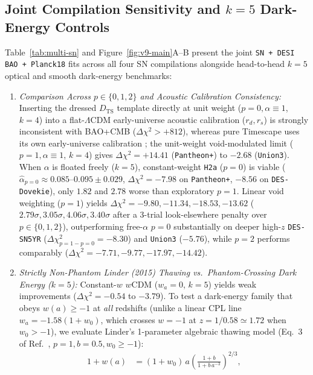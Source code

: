 \documentclass[11pt,a4paper]{article}
\begin{document}
\subsection{Joint Compilation Sensitivity and $k = 5$ Dark-Energy Controls}
Table~\ref{tab:multi-sn} and Figure~\ref{fig:v9-main}A--B present the joint \texttt{SN + DESI BAO + Planck18} fits across all four SN compilations alongside head-to-head $k = 5$ optical and smooth dark-energy benchmarks:
\begin{enumerate}
    \item \textit{Comparison Across $p \in \{0, 1, 2\}$ and Acoustic Calibration Consistency:} Inserting the dressed $D_{\mathrm{TS}}$ template directly at unit weight ($p = 0, \alpha \equiv 1$, $k = 4$) into a flat-$\Lambda$CDM early-universe acoustic calibration ($r_d, r_s$) is strongly inconsistent with BAO+CMB ($\Delta\chi^2 > +812$), whereas pure Timescape uses its own early-universe calibration \cite{Wiltshire2009PRD}; the unit-weight void-modulated limit ($p = 1, \alpha \equiv 1$, $k = 4$) gives $\Delta\chi^2 = +14.41$ (\texttt{Pantheon+}) to $-2.68$ (\texttt{Union3}). When $\alpha$ is floated freely ($k = 5$), constant-weight \texttt{H2a} ($p = 0$) is viable ($\hat{\alpha}_{p=0} \approx 0.085\text{--}0.095 \pm 0.029$, $\Delta\chi^2 = -7.98$ on \texttt{Pantheon+}, $-8.56$ on \texttt{DES-Dovekie}), only $1.82$ and $2.78$ worse than exploratory $p = 1$. Linear void weighting ($p = 1$) yields $\Delta\chi^2 = -9.80, -11.34, -18.53, -13.62$ ($2.79\sigma, 3.05\sigma, 4.06\sigma, 3.40\sigma$ after a $3$-trial look-elsewhere penalty over $p \in \{0, 1, 2\}$), outperforming free-$\alpha$ $p = 0$ substantially on deeper high-$z$ \texttt{DES-SN5YR} ($\Delta\chi^2_{p=1-p=0} = -8.30$) and \texttt{Union3} ($-5.76$), while $p = 2$ performs comparably ($\Delta\chi^2 = -7.71, -9.77, -17.97, -14.42$).
    \item \textit{Strictly Non-Phantom Linder (2015) Thawing vs.\ Phantom-Crossing Dark Energy ($k = 5$):} Constant-$w$ $w$CDM ($w_a = 0$, $k = 5$) yields weak improvements ($\Delta\chi^2 = -0.54$ to $-3.79$). To test a dark-energy family that obeys $w(a) \ge -1$ at \textit{all} redshifts (unlike a linear CPL line $w_a = -1.58(1+w_0)$, which crosses $w = -1$ at $z = 1/0.58 \simeq 1.72$ when $w_0 > -1$), we evaluate Linder's \cite{Linder2015Thawing} 1-parameter algebraic thawing model (Eq.~3 of Ref.~\cite{Linder2015Thawing}, $p = 1, b = 0.5, w_0 \ge -1$):
    \begin{equation}
    \begin{split}
        1 + w(a) &= (1 + w_0)\,a\left(\frac{1 + b}{1 + b\,a^{-3}}\right)^{2/3}, \\

\end{split}
\end{equation}
\end{enumerate}
\end{document}
